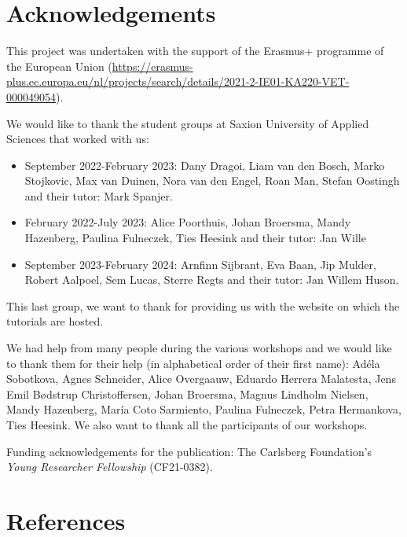 \documentclass[
]{article}
\begin{document}
\hypertarget{acknowledgements}{%
\section{Acknowledgements}\label{acknowledgements}}

This project was undertaken with the support of the Erasmus+ programme of the European Union (\url{https://erasmus-plus.ec.europa.eu/nl/projects/search/details/2021-2-IE01-KA220-VET-000049054}).

We would like to thank the student groups at Saxion University of Applied Sciences that worked with us:

\begin{itemize}
\item
  September 2022-February 2023: Dany Dragoi, Liam van den Bosch, Marko Stojkovic, Max van Duinen, Nora van den Engel, Roan Man, Stefan Oostingh and their tutor: Mark Spanjer.
\item
  February 2022-July 2023: Alice Poorthuis, Johan Broersma, Mandy Hazenberg, Paulina Fulneczek, Ties Heesink and their tutor: Jan Wille
\item
  September 2023-February 2024: Arnfinn Sijbrant, Eva Baan, Jip Mulder, Robert Aalpoel, Sem Lucas, Sterre Regts and their tutor: Jan Willem Huson.
\end{itemize}

This last group, we want to thank for providing us with the website on which the tutorials are hosted.

We had help from many people during the various workshops and we would like to thank them for their help (in alphabetical order of their first name): Adéla Sobotkova, Agnes Schneider, Alice Overgaauw, Eduardo Herrera Malatesta, Jens Emil Bødstrup Christoffersen, Johan Broersma, Magnus Lindholm Nielsen, Mandy Hazenberg, María Coto Sarmiento, Paulina Fulneczek, Petra Hermankova, Ties Heesink. We also want to thank all the participants of our workshops.

Funding acknowledgements for the publication: The Carlsberg Foundation's \emph{Young Researcher Fellowship} (CF21-0382).

\hypertarget{references}{%
\section*{References}\label{references}}
\end{document}
